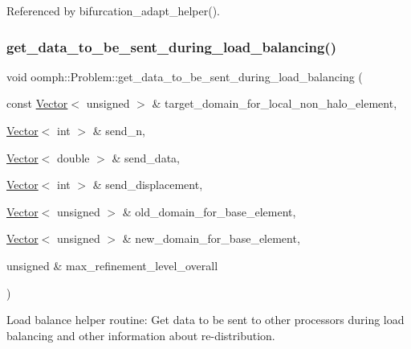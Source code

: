 Referenced by bifurcation\+\_\+adapt\+\_\+helper().

\mbox{\label{classoomph_1_1Problem_ad150d0fa8f2e2ccff79f8ecd78cc1343}} 
\subsubsection{\texorpdfstring{get\+\_\+data\+\_\+to\+\_\+be\+\_\+sent\+\_\+during\+\_\+load\+\_\+balancing()}{get\_data\_to\_be\_sent\_during\_load\_balancing()}}
{\footnotesize\ttfamily void oomph\+::\+Problem\+::get\+\_\+data\+\_\+to\+\_\+be\+\_\+sent\+\_\+during\+\_\+load\+\_\+balancing (\begin{DoxyParamCaption}\item[{const \hyperlink{classoomph_1_1Vector}{Vector}$<$ unsigned $>$ \&}]{target\+\_\+domain\+\_\+for\+\_\+local\+\_\+non\+\_\+halo\+\_\+element,  }\item[{\hyperlink{classoomph_1_1Vector}{Vector}$<$ int $>$ \&}]{send\+\_\+n,  }\item[{\hyperlink{classoomph_1_1Vector}{Vector}$<$ double $>$ \&}]{send\+\_\+data,  }\item[{\hyperlink{classoomph_1_1Vector}{Vector}$<$ int $>$ \&}]{send\+\_\+displacement,  }\item[{\hyperlink{classoomph_1_1Vector}{Vector}$<$ unsigned $>$ \&}]{old\+\_\+domain\+\_\+for\+\_\+base\+\_\+element,  }\item[{\hyperlink{classoomph_1_1Vector}{Vector}$<$ unsigned $>$ \&}]{new\+\_\+domain\+\_\+for\+\_\+base\+\_\+element,  }\item[{unsigned \&}]{max\+\_\+refinement\+\_\+level\+\_\+overall }\end{DoxyParamCaption})\hspace{0.3cm}{\ttfamily [private]}}



Load balance helper routine\+: Get data to be sent to other processors during load balancing and other information about re-\/distribution. 


